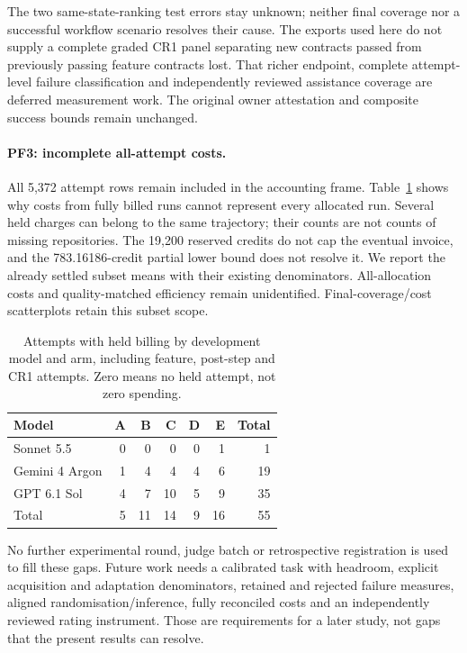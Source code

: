 The two same-state-ranking test errors stay unknown; neither final coverage
nor a successful workflow scenario resolves their cause. The exports used
here do not supply a complete graded CR1 panel separating new contracts
passed from previously passing feature contracts lost. That richer endpoint,
complete attempt-level failure classification and independently reviewed
assistance coverage are deferred measurement work. The original owner
attestation and composite success bounds remain unchanged.

\paragraph{PF3: incomplete all-attempt costs.}
All 5,372 attempt rows remain included in the accounting frame.
Table~\ref{tab:heldbillingcells} shows why costs from fully billed runs
cannot represent every allocated run. Several held charges can belong to
the same trajectory;
their counts are not counts of missing repositories. The 19,200 reserved
credits do not cap the eventual invoice, and the 783.16186-credit partial
lower bound does not resolve it. We report the already settled subset
means with their existing denominators. All-allocation costs and
quality-matched efficiency remain unidentified. Final-coverage/cost scatterplots
retain this subset scope.

\begin{table}[!htbp]
\centering\small
\caption{Attempts with held billing by development model and arm,
including feature, post-step and CR1 attempts. Zero means no held attempt,
not zero spending.}\label{tab:heldbillingcells}

\begin{tabular*}{\textwidth}{@{\extracolsep{\fill}}lrrrrrr@{}}
\toprule
Model & A & B & C & D & E & Total \\
\midrule
Sonnet 5.5 & 0 & 0 & 0 & 0 & 1 & 1 \\
Gemini 4 Argon & 1 & 4 & 4 & 4 & 6 & 19 \\
GPT 6.1 Sol & 4 & 7 & 10 & 5 & 9 & 35 \\
\midrule
Total & 5 & 11 & 14 & 9 & 16 & 55 \\
\bottomrule
\end{tabular*}
\end{table}

No further experimental round, judge batch or retrospective registration
is used to fill these gaps. Future work needs a calibrated task with
headroom, explicit acquisition and adaptation denominators, retained and
rejected failure measures, aligned randomisation/inference, fully reconciled
costs and an independently reviewed rating instrument. Those are requirements for a later study, not gaps that the present
results can resolve.

